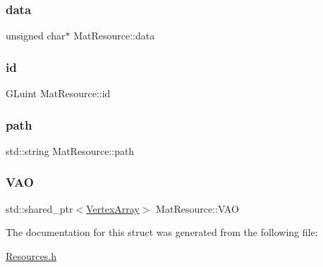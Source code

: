 \subsubsection{\texorpdfstring{data}{data}}
{\footnotesize\ttfamily unsigned char$\ast$ Mat\+Resource\+::data}

\mbox{\label{struct_mat_resource_ab05a8aa12860a2f550a9c4ff0fb1ce4e}} 
\subsubsection{\texorpdfstring{id}{id}}
{\footnotesize\ttfamily G\+Luint Mat\+Resource\+::id}

\mbox{\label{struct_mat_resource_ad4586d33efdbb0a46137f01eb22043f8}} 
\subsubsection{\texorpdfstring{path}{path}}
{\footnotesize\ttfamily std\+::string Mat\+Resource\+::path}

\mbox{\label{struct_mat_resource_ab208f0b2bcb3478c64ee208ebceb1f18}} 
\subsubsection{\texorpdfstring{V\+AO}{VAO}}
{\footnotesize\ttfamily std\+::shared\+\_\+ptr$<$\mbox{\hyperlink{class_vertex_array}{Vertex\+Array}}$>$ Mat\+Resource\+::\+V\+AO}



The documentation for this struct was generated from the following file\+:\begin{DoxyCompactItemize}
\item 
\mbox{\hyperlink{_resources_8h}{Resources.\+h}}\end{DoxyCompactItemize}
